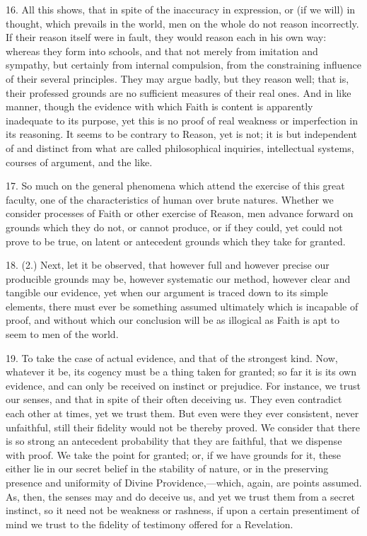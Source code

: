 16. All this shows, that in spite of the inaccuracy in expression,
or (if we will) in thought, which prevails in the world, men on the
whole do not reason incorrectly. If their reason itself were in fault,
they would reason each in his own way: whereas they form into schools,
and that not merely from imitation and sympathy, but certainly from
internal compulsion, from the constraining influence of their several
principles. They may argue badly, but they reason well; that is, their
professed grounds are no sufficient measures of their real ones. And
in like manner, though the evidence with which Faith is content is
apparently inadequate to its purpose, yet this is no proof of real
weakness or imperfection in its reasoning. It seems to be contrary to
Reason, yet is not; it is but independent of and distinct from what
are called philosophical inquiries, intellectual systems, courses of
argument, and the like.

17. So much on the general phenomena which attend the exercise of
this great faculty, one of the characteristics of human over brute
natures. Whether we consider processes of Faith or other exercise of
Reason, men advance forward on grounds which they do not, or cannot
produce, or if they could, yet could not prove to be true, on latent
or antecedent grounds which they take for granted.

18. (2.) Next, let it be observed, that however full and however
precise our producible grounds may be, however systematic our method,
however clear and tangible our evidence, yet when our argument is
traced down to its simple elements, there must ever be something
assumed ultimately which is incapable of proof, and without which our
conclusion will be as illogical as Faith is apt to seem to men of the
world.

19. To take the case of actual evidence, and that of the strongest
kind. Now, whatever it be, its cogency must be a thing taken for
granted; so far it is its own evidence, and can only be received on
instinct or prejudice. For instance, we trust our senses, and that in
spite of their often deceiving us. They even contradict each other at
times, yet we trust them. But even were they ever consistent, never
unfaithful, still their fidelity would not be thereby proved. We
consider that there is so strong an antecedent probability that they
are faithful, that we dispense with proof. We take the point for
granted; or, if we have grounds for it, these either lie in our secret
belief in the stability of nature, or in the preserving presence and
uniformity of Divine Providence,—which, again, are points assumed.
As, then, the senses may and do deceive us, and yet we trust them from
a secret instinct, so it need not be weakness or rashness, if upon a
certain presentiment of mind we trust to the fidelity of testimony
offered for a Revelation.

